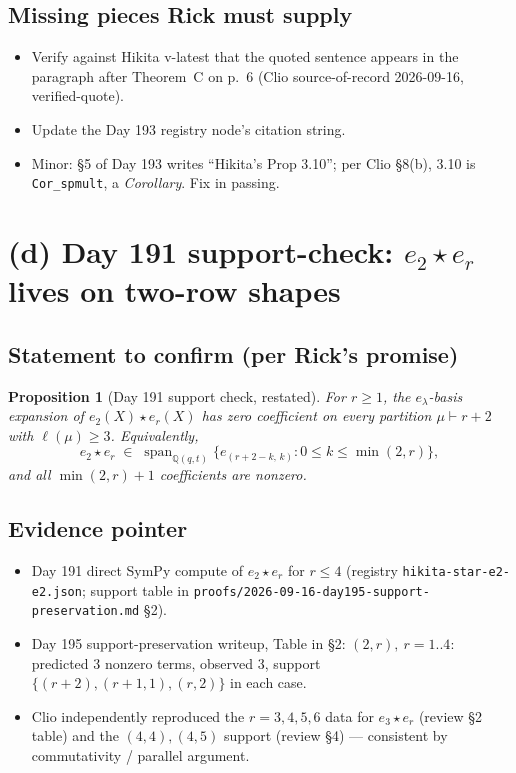 \documentclass[11pt]{article}
\newtheorem{proposition}[theorem]{Proposition}
\theoremstyle{definition}
\begin{document}
\subsection*{Missing pieces Rick must supply}
\begin{itemize}[leftmargin=1.5em]
  \item Verify against Hikita v-latest that the quoted sentence
        appears in the paragraph after Theorem~C on p.~6 (Clio
        source-of-record 2026-09-16, verified-quote).
  \item Update the Day 193 registry node's citation string.
  \item Minor: \S5 of Day 193 writes ``Hikita's Prop 3.10''; per
        Clio \S8(b), 3.10 is \texttt{Cor\_spmult}, a
        \emph{Corollary}. Fix in passing.
\end{itemize}

\section{(d) Day 191 support-check: $e_2\star e_r$ lives on two-row shapes}
\label{sec:day191-support}

\subsection*{Statement to confirm (per Rick's promise)}
\begin{proposition}[Day 191 support check, restated]\label{prop:day191-support}
For $r\ge 1$, the $e_\lambda$-basis expansion of $e_2(X)\star e_r(X)$
has zero coefficient on every partition $\mu\vdash r+2$ with $\ell(\mu)\ge 3$.
Equivalently,
\begin{equation}\label{eq:e2-er-support}
  e_2\star e_r \;\in\; \operatorname{span}_{\mathbb Q(q,t)}
      \bigl\{ e_{(r+2-k,\,k)} : 0\le k \le \min(2,r) \bigr\},
\end{equation}
and all $\min(2,r)+1$ coefficients are nonzero.
\end{proposition}

\subsection*{Evidence pointer}
\begin{itemize}[leftmargin=1.5em]
  \item Day 191 direct SymPy compute of $e_2\star e_r$ for $r\le 4$
        (registry \verb|hikita-star-e2-e2.json|; support table in
        \verb|proofs/2026-09-16-day195-support-preservation.md|
        \S2).
  \item Day 195 support-preservation writeup, Table in \S2:
        $(2,r),\ r=1..4$: predicted 3 nonzero terms, observed 3,
        support $\{(r+2),(r+1,1),(r,2)\}$ in each case.
  \item Clio independently reproduced the $r=3,4,5,6$ data for
        $e_3\star e_r$ (review \S2 table) and the $(4,4),(4,5)$
        support (review \S4) --- consistent by commutativity /
        parallel argument.
\end{itemize}
\end{document}
